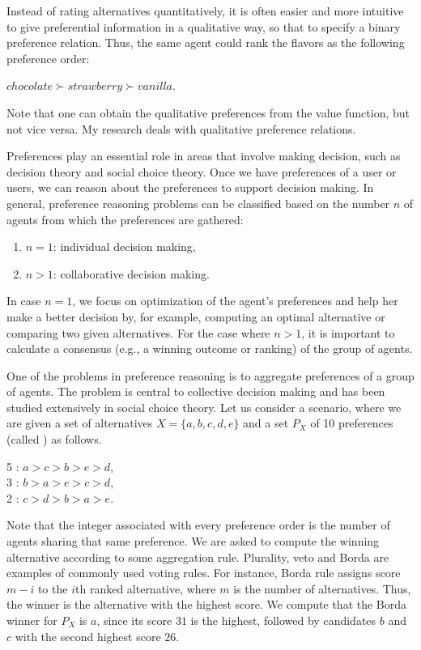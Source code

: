 Instead of rating alternatives quantitatively, it is
often easier and more intuitive to give preferential information
in a qualitative way,
so that to specify a binary preference relation.
Thus, the same agent could rank the flavors as the following
preference order:
\begin{center}
	$chocolate \succ strawberry \succ vanilla$.
\end{center}
Note that one can obtain the qualitative preferences from
the value function, but not vice versa.
My research deals with qualitative preference relations.

Preferences play an essential role in areas that involve making
decision, such as decision theory and social choice theory.
Once we have preferences of a user or users, we can reason about
the preferences to support decision making.
In general, preference reasoning problems can be classified
based on the number $n$ of agents from which the preferences are gathered:
\begin{enumerate} \itemsep -4pt
	\item $n=1$: individual decision making,
	\item $n>1$: collaborative decision making.
\end{enumerate}
In case $n=1$, we focus on optimization of the agent's preferences and
help her make a better decision by, for example, computing an optimal
alternative or comparing two given alternatives.  For the case
where $n>1$, it is important to calculate
a consensus (e.g., a winning outcome or ranking)
of the group of agents.

One of the problems in preference reasoning is to
aggregate preferences of a group of
agents. The problem is central to collective decision making and has been studied
extensively in social choice theory. 
Let us consider a scenario, where we are
given a set of alternatives $X = \{ a,b,c,d,e \}$ and a set $P_X$ of 10 
preferences (called ) as follows.
	\begin{center}
		5 : $a > c > b > e > d$,\\
		3 : $b > a > e > c > d$,\\
		2 : $c > d > b > a > e$.
	\end{center}
	
Note that the integer associated with every preference order
is the number of agents sharing that same preference.
We are asked to compute the winning alternative according to some aggregation rule. 
Plurality, veto and Borda are examples of commonly used voting rules.
For instance, Borda rule assigns score $m-i$ to the $i$th ranked 
alternative, where $m$ is the number of alternatives.
Thus, the winner is the alternative with the highest score.
We compute that the Borda winner for $P_X$ is $a$, since its 
score $31$ is the highest, followed by candidates $b$ and $c$
with the second highest score $26$.

